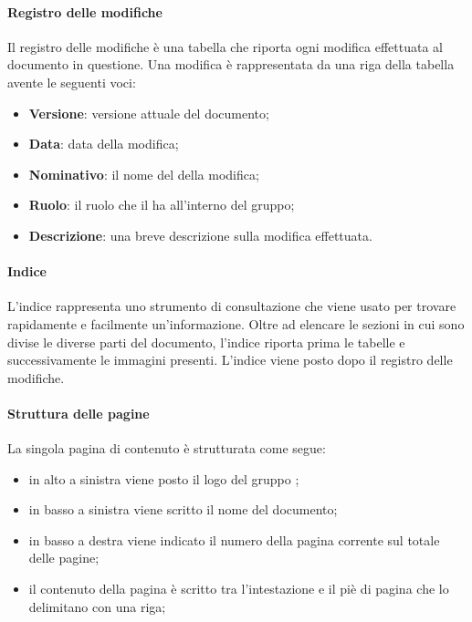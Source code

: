 \paragraph{Registro delle modifiche}
Il registro delle modifiche è una tabella che riporta ogni modifica effettuata al documento in questione. Una modifica è rappresentata da una riga della tabella avente le seguenti voci:
\begin{itemize}

	\item \textbf{Versione}: versione attuale del documento;
	
	\item \textbf{Data}: data della modifica;
	
	\item \textbf{Nominativo}: il nome del  della modifica;
	
	\item \textbf{Ruolo}: il ruolo che il  ha all'interno del gruppo;

	\item \textbf{Descrizione}: una breve descrizione sulla modifica effettuata.
\end{itemize}

\paragraph{Indice}
L'indice rappresenta uno strumento di consultazione che viene usato per trovare rapidamente e facilmente un'informazione. Oltre ad elencare le sezioni in cui sono divise le diverse parti del documento, l'indice riporta prima le tabelle e successivamente le immagini presenti. L'indice viene posto dopo il registro delle modifiche.

\paragraph{Struttura delle pagine}
La singola pagina di contenuto è strutturata come segue:
\begin{itemize}

	\item in alto a sinistra viene posto il logo del gruppo \Gruppo{};
	
	\item in basso a sinistra viene scritto il nome del documento;
	
	\item in basso a destra viene indicato il numero della pagina corrente sul totale delle pagine;
	
	\item il contenuto della pagina è scritto tra l'intestazione e il piè di pagina che lo delimitano con una riga;
\end{itemize}

